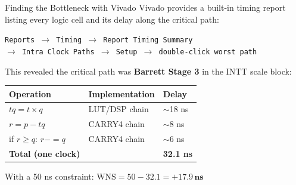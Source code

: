 \documentclass[aspectratio=169, 11pt]{beamer}
\begin{document}
\begin{frame}{Finding the Bottleneck with Vivado}
Vivado provides a built-in timing report listing every logic cell and its delay along the critical path:

\vspace{0.2cm}
\begin{center}
\texttt{Reports $\to$ Timing $\to$ Report Timing Summary}\\
\texttt{$\to$ Intra Clock Paths $\to$ Setup $\to$ double-click worst path}
\end{center}

\vspace{0.3em}
This revealed the critical path was \textbf{Barrett Stage 3} in the INTT scale block:

\vspace{0.2em}
\begin{center}
\small
\begin{tabular}{lll}
\toprule
\textbf{Operation} & \textbf{Implementation} & \textbf{Delay} \\
\midrule
$tq = t \times q$       & LUT/DSP chain  & $\sim$18 ns \\
$r = p - tq$             & CARRY4 chain   & $\sim$8 ns \\
if $r \geq q$: $r -= q$ & CARRY4 chain   & $\sim$6 ns \\
\midrule
\textbf{Total (one clock)} & & \textbf{32.1 ns} \\
\bottomrule
\end{tabular}
\end{center}

\vspace{0.3em}
With a 50 ns constraint: $\text{WNS} = 50 - 32.1 = \mathbf{+17.9\,\text{ns}}$
\end{frame}
\end{document}
